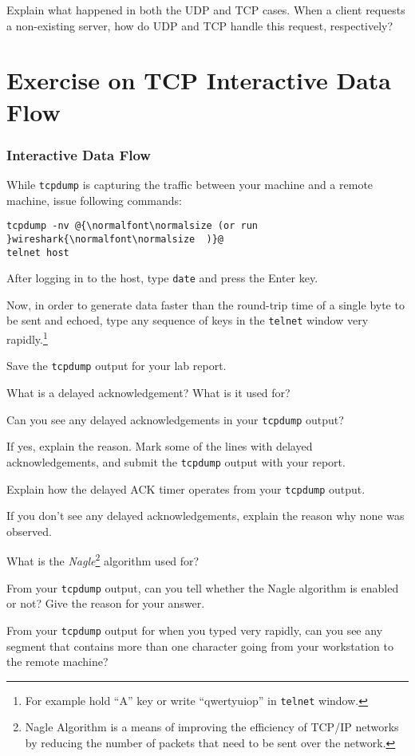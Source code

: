\documentclass{../UTNetLab}
\begin{document}
    \begin{report}
        \item Explain what happened in both the UDP and TCP cases. When a client requests a non-existing server, how do UDP and TCP handle this request, respectively?
    \end{report}

\part{Exercise on TCP Interactive Data Flow}
\section{Interactive Data Flow}
While \lstinline{tcpdump} is capturing the traffic between your machine and a remote machine, issue following commands:
    \begin{lstlisting}[emph={host}]
tcpdump -nv @{\normalfont\normalsize (or run }wireshark{\normalfont\normalsize  )}@
telnet host
    \end{lstlisting}
    After logging in to the host, type \lstinline{date} and press the {Enter} key.

    Now, in order to generate data faster than the round-trip time of a single byte to be sent and echoed, type any sequence of keys in the \lstinline{telnet} window very rapidly.\footnote{For example hold ``A'' key or write ``qwertyuiop'' in \lstinline{telnet} window.}

    {Save} the \lstinline{tcpdump} output for your lab report.
    
    \begin{report}
    \item What is a delayed acknowledgement?
    What is it used for?
    
    \item Can you see any delayed acknowledgements in your \lstinline{tcpdump} output?

    If yes, explain the reason.
    Mark some of the lines with delayed acknowledgements, and submit the \lstinline{tcpdump} output with your report.

    Explain how the delayed ACK timer operates from your \lstinline{tcpdump} output.

    If you don’t see any delayed acknowledgements, explain the reason why none was observed.
    
    \item What is the \textit{Nagle}\footnote{Nagle Algorithm is a means of improving the efficiency of TCP/IP networks by reducing the number of packets that need to be sent over the network.} algorithm used for?

    From your \lstinline{tcpdump} output, can you tell whether the Nagle algorithm is enabled or not? Give the reason for your answer.

    From your \lstinline{tcpdump} output for when you typed very rapidly, can you see any segment that contains more than one character going from your workstation to the remote machine?
    \end{report}
\end{document}
